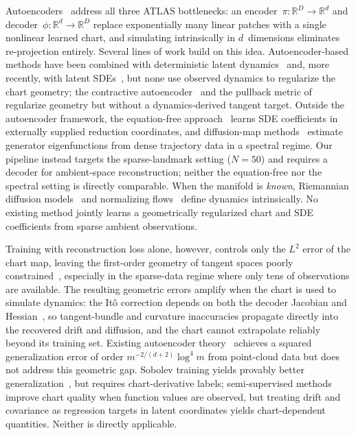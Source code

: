 \documentclass[11pt]{article}
\newcommand{\R}{\mathbb{R}}
\begin{document}
Autoencoders~\cite{lee2020model,otto2019linearly,peterfreund2020local,
floryan2022data,champion2019data,kevrekidis2024thinner,
schonsheck2020chartautoencodersmanifoldstructured}
address all three ATLAS bottlenecks:
an encoder~$\pi\!:\R^D\!\to\R^d$ and
decoder~$\phi\!:\R^d\!\to\R^D$
replace exponentially many linear patches with a single nonlinear
learned chart, and simulating intrinsically in $d$~dimensions
eliminates re-projection entirely.
Several lines of work build on this idea.
Autoencoder-based methods have been combined with
deterministic latent
dynamics~\cite{champion2019data,lusch2018deep,linot2020deep,
floryan2022data,bertalan2019learning}
and, more recently, with latent
SDEs~\cite{hasan2022identifying,li2020scalable},
but none use observed dynamics to regularize
the chart geometry; the contractive
autoencoder~\cite{contractiveAutoEncoders} and the
pullback metric of~\cite{arvanitidis2018latent}
regularize geometry but without a dynamics-derived
tangent target.
Outside the autoencoder framework,
the equation-free approach~\cite{kevrekidis2003equation}
learns SDE coefficients in externally supplied reduction
coordinates, and diffusion-map
methods~\cite{coifman2008diffusion,evangelou2023double,dietrich2023learning}
estimate generator eigenfunctions from dense trajectory
data in a spectral regime.
Our pipeline instead targets the sparse-landmark setting
($N{=}50$) and requires a decoder for ambient-space
reconstruction; neither the equation-free nor the
spectral setting is directly comparable.
When the manifold is \emph{known},
Riemannian diffusion
models~\cite{debortoli,huang2022riemannian} and
normalizing
flows~\cite{mathieu2020riemannian} define dynamics
intrinsically.
No existing method jointly learns a geometrically
regularized chart and SDE coefficients from sparse
ambient observations.

Training with reconstruction loss alone, however,
controls only the $L^2$ error of the chart map, leaving the
first-order geometry of tangent spaces poorly
constrained~\cite{floryan2022data}, especially in the
sparse-data regime where only tens of observations are
available.
The resulting geometric errors amplify when the chart
is used to simulate dynamics: the It\^o correction
depends on both the decoder Jacobian and
Hessian~\cite{armstrong2018intrinsicjets,Armstrong2024},
so tangent-bundle and curvature inaccuracies propagate
directly into the recovered drift and diffusion, and
the chart cannot extrapolate reliably beyond its
training set.
Existing autoencoder
theory~\cite{schonsheck2020chartautoencodersmanifoldstructured,
liu2023deepnonparametricestimationintrinsic} achieves a squared
generalization error of order $m^{-2/(d+2)}\log^4 m$ from point-cloud
data but does not address this geometric gap.
Sobolev training yields
provably better generalization~\cite{yang2025deeperwiderperspectiveoptimal,
yang2025deepneuralnetworksgeneral}, but requires
chart-derivative labels;
semi-supervised
methods~\cite{schonsheck2024semisupervisedmanifoldlearningcomplexity}
improve chart quality when function values are observed,
but treating drift and covariance as regression
targets in latent coordinates yields chart-dependent
quantities.
Neither is directly applicable.
\end{document}
